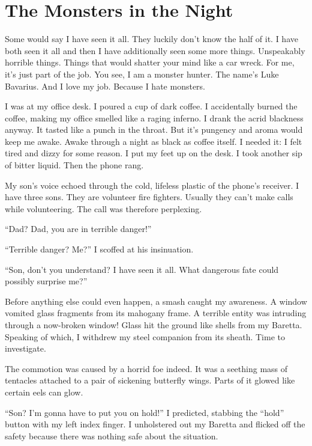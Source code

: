 \chapter{The Monsters in the Night}


Some would say I have seen it all. They luckily don't know
the half of it. I have both seen it all and then I have
additionally seen some more things. Unspeakably horrible things.
Things that would shatter your mind like a car wreck. For me,
it's just part of the job. You see, I am a monster hunter.
The name's Luke Bavarius. And I love my job. Because I hate
monsters.



I was at my office desk. I poured a cup of dark coffee. I
accidentally burned the coffee, making my office smelled like a
raging inferno. I drank the acrid blackness anyway. It tasted like
a punch in the throat. But it's pungency and aroma would keep
me awake. Awake through a night as black as coffee itself. I needed
it: I felt tired and dizzy for some reason. I put my feet up on the
desk. I took another sip of bitter liquid. Then the phone
rang.



My son's voice echoed through the cold, lifeless plastic of
the phone's receiver. I have three sons. They are volunteer
fire fighters. Usually they can't make calls while
volunteering. The call was therefore perplexing.



``Dad? Dad, you are in terrible danger!''

``Terrible danger? Me?'' I scoffed at his
insinuation.

``Son, don't you understand? I have seen it all. What
dangerous fate could possibly surprise me?''



Before anything else could even happen, a smash caught my
awareness. A window vomited glass fragments from its mahogany
frame. A terrible entity was intruding through a now-broken window!
Glass hit the ground like shells from my Baretta. Speaking of
which, I withdrew my steel companion from its sheath. Time to
investigate.



The commotion was caused by a horrid foe indeed. It was a seething
mass of tentacles attached to a pair of sickening butterfly wings.
Parts of it glowed like certain eels can glow.



``Son? I'm gonna have to put you on hold!'' I
predicted, stabbing the ``hold'' button with my left
index finger. I unholstered out my Baretta and flicked off the
safety because there was nothing safe about the situation.



